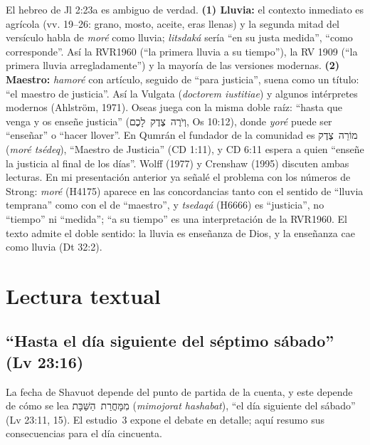\documentclass[11pt,letterpaper]{article}
\newcommand{\heb}[1]{\mbox{\foreignlanguage{hebrew}{#1}}}
\begin{document}
\begin{nota}
El hebreo de Jl 2:23a es ambiguo de verdad. \textbf{(1) Lluvia:} el contexto inmediato es agrícola (vv. 19--26: grano, mosto, aceite, eras llenas) y la segunda mitad del versículo habla de \emph{moré} como lluvia; \emph{litsdaká} sería ``en su justa medida'', ``como corresponde''. Así la RVR1960 (``la primera lluvia a su tiempo''), la RV 1909 (``la primera lluvia arregladamente'') y la mayoría de las versiones modernas. \textbf{(2) Maestro:} \emph{hamoré} con artículo, seguido de ``para justicia'', suena como un título: ``el maestro de justicia''. Así la Vulgata (\emph{doctorem iustitiae}) y algunos intérpretes modernos (Ahlström, 1971). Oseas juega con la misma doble raíz: ``hasta que venga y os enseñe justicia'' (\heb{וְיֹרֶה צֶדֶק לָכֶם}, Os 10:12), donde \emph{yoré} puede ser ``enseñar'' o ``hacer llover''. En Qumrán el fundador de la comunidad es \heb{מוֹרֵה צֶדֶק} (\emph{moré tsédeq}), ``Maestro de Justicia'' (CD 1:11), y CD 6:11 espera a quien ``enseñe la justicia al final de los días''. Wolff (1977) y Crenshaw (1995) discuten ambas lecturas. En mi presentación anterior ya señalé el problema con los números de Strong: \emph{moré} (H4175) aparece en las concordancias tanto con el sentido de ``lluvia temprana'' como con el de ``maestro'', y \emph{tsedaqá} (H6666) es ``justicia'', no ``tiempo'' ni ``medida''; ``a su tiempo'' es una interpretación de la RVR1960. El texto admite el doble sentido: la lluvia es enseñanza de Dios, y la enseñanza cae como lluvia (Dt 32:2).
\end{nota}

\section{Lectura textual}

\subsection{``Hasta el día siguiente del séptimo sábado'' (Lv 23:16)}

La fecha de Shavuot depende del punto de partida de la cuenta, y este depende de cómo se lea \heb{מִמָּחֳרַת הַשַּׁבָּת} (\emph{mimojorat hashabat}), ``el día siguiente del sábado'' (Lv 23:11, 15). El estudio~3 expone el debate en detalle; aquí resumo sus consecuencias para el día cincuenta.
\end{document}
